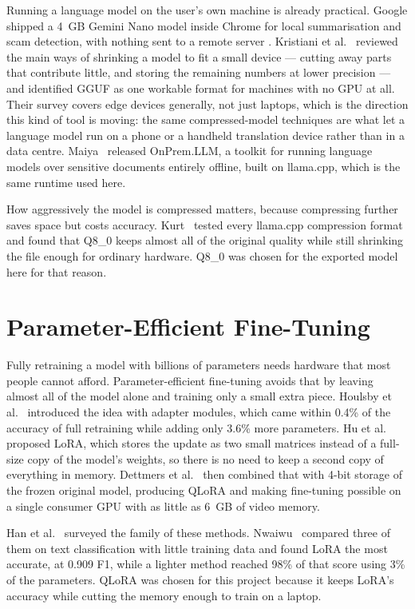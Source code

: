 Running a language model on the user's own machine is already practical. Google shipped a 4~GB Gemini Nano model inside Chrome for local summarisation and scam detection, with nothing sent to a remote server \cite{cyberinsider2026geminanano}. Kristiani et al.~\cite{kristiani2026deploying} reviewed the main ways of shrinking a model to fit a small device --- cutting away parts that contribute little, and storing the remaining numbers at lower precision --- and identified GGUF as one workable format for machines with no GPU at all. Their survey covers edge devices generally, not just laptops, which is the direction this kind of tool is moving: the same compressed-model techniques are what let a language model run on a phone or a handheld translation device rather than in a data centre. Maiya~\cite{maiya2025onprem} released OnPrem.LLM, a toolkit for running language models over sensitive documents entirely offline, built on llama.cpp, which is the same runtime used here.

How aggressively the model is compressed matters, because compressing further saves space but costs accuracy. Kurt~\cite{kurt2026quantization} tested every llama.cpp compression format and found that Q8\_0 keeps almost all of the original quality while still shrinking the file enough for ordinary hardware. Q8\_0 was chosen for the exported model here for that reason.

\section{Parameter-Efficient Fine-Tuning}

Fully retraining a model with billions of parameters needs hardware that most people cannot afford. Parameter-efficient fine-tuning avoids that by leaving almost all of the model alone and training only a small extra piece. Houlsby et al.~\cite{houlsby2019parameter} introduced the idea with adapter modules, which came within 0.4\% of the accuracy of full retraining while adding only 3.6\% more parameters. Hu et al.~\cite{hu2022lora} proposed LoRA, which stores the update as two small matrices instead of a full-size copy of the model's weights, so there is no need to keep a second copy of everything in memory. Dettmers et al.~\cite{dettmers2023qlora} then combined that with 4-bit storage of the frozen original model, producing QLoRA and making fine-tuning possible on a single consumer GPU with as little as 6~GB of video memory.

Han et al.~\cite{han2024peft} surveyed the family of these methods. Nwaiwu~\cite{nwaiwu2025peft} compared three of them on text classification with little training data and found LoRA the most accurate, at 0.909 F1, while a lighter method reached 98\% of that score using 3\% of the parameters. QLoRA was chosen for this project because it keeps LoRA's accuracy while cutting the memory enough to train on a laptop.

